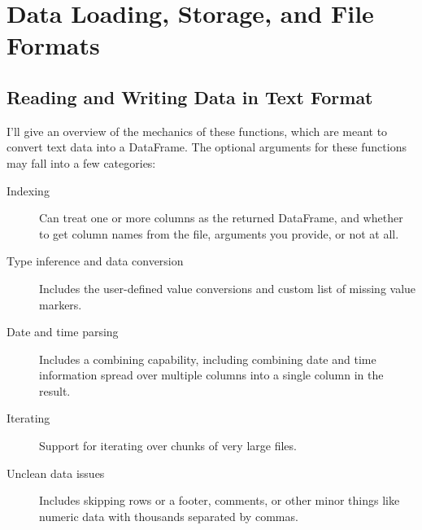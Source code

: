 \chapter{Data Loading, Storage, and File Formats\label{Data Loading, Storage, and File Formats}}

\section{Reading and Writing Data in Text Format}
I'll give an overview of the mechanics of these functions, which are meant to convert text data into a DataFrame. The optional arguments for these functions may fall into a few categories:
\begin{description}
    \item[Indexing] Can treat one or more columns as the returned DataFrame, and whether to get column names from the file, arguments you provide, or not at all.
    \item[Type inference and data conversion] Includes the user-defined value conversions and custom list of missing value markers.
    \item[Date and time parsing] Includes a combining capability, including combining date and time information spread over multiple columns into a single column in the result.
    \item[Iterating] Support for iterating over chunks of very large files.
    \item[Unclean data issues] Includes skipping rows or a footer, comments, or other minor things like numeric data with thousands separated by commas.
\end{description}